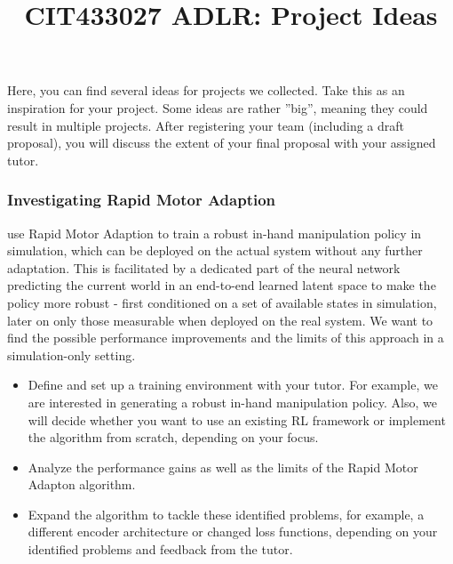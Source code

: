 \documentclass[a4paper]{article}
\title{CIT433027 ADLR: Project Ideas}
\author{}
\begin{document}
\maketitle

Here, you can find several ideas for projects we collected.
Take this as an inspiration for your project.
Some ideas are rather ”big”, meaning they could result in multiple projects.
After registering your team (including a draft proposal), you will discuss the extent of your final proposal with your assigned tutor.


\subsubsection{Investigating Rapid Motor Adaption}
\citet{qi2022inhand} use Rapid Motor Adaption to train a robust in-hand manipulation policy in simulation, which can be deployed on the actual system without any further adaptation.
This is facilitated by a dedicated part of the neural network predicting the current world in an end-to-end learned latent space to make the policy more robust - first conditioned on a set of available states in simulation, later on only those measurable when deployed on the real system.
We want to find the possible performance improvements and the limits of this approach in a simulation-only setting.
\begin{itemize}
  \item Define and set up a training environment with your tutor.
  For example, we are interested in generating a robust in-hand manipulation policy.
  Also, we will decide whether you want to use an existing RL framework or implement the algorithm from scratch, depending on your focus.
  \item Analyze the performance gains as well as the limits of the Rapid Motor Adapton algorithm.
  \item Expand the algorithm to tackle these identified problems, for example, a different encoder architecture or changed loss functions, depending on your identified problems and feedback from the tutor.
\end{itemize}

\end{document}
